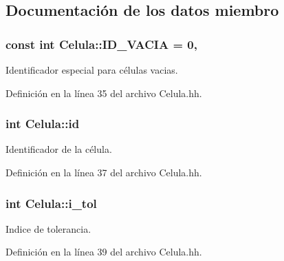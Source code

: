 \subsection{Documentación de los datos miembro}
\hypertarget{class_celula_affff67b41ead0b1f3a3f4faad6c049ac}{
\subsubsection[{I\+D\+\_\+\+V\+A\+C\+I\+A}]{\setlength{\rightskip}{0pt plus 5cm}const int Celula\+::\+I\+D\+\_\+\+V\+A\+C\+I\+A = 0\hspace{0.3cm}{\ttfamily [static]}, {\ttfamily [private]}}}\label{class_celula_affff67b41ead0b1f3a3f4faad6c049ac}


Identificador especial para células vacias. 



Definición en la línea 35 del archivo Celula.\+hh.

\hypertarget{class_celula_a0984a8b3deeed4979ed6f6141edc3c0c}{
\subsubsection[{id}]{\setlength{\rightskip}{0pt plus 5cm}int Celula\+::id\hspace{0.3cm}{\ttfamily [private]}}}\label{class_celula_a0984a8b3deeed4979ed6f6141edc3c0c}


Identificador de la célula. 



Definición en la línea 37 del archivo Celula.\+hh.

\hypertarget{class_celula_abda46be7b30a13909d9819c46238080b}{
\subsubsection[{i\+\_\+tol}]{\setlength{\rightskip}{0pt plus 5cm}int Celula\+::i\+\_\+tol\hspace{0.3cm}{\ttfamily [private]}}}\label{class_celula_abda46be7b30a13909d9819c46238080b}


Indice de tolerancia. 



Definición en la línea 39 del archivo Celula.\+hh.

